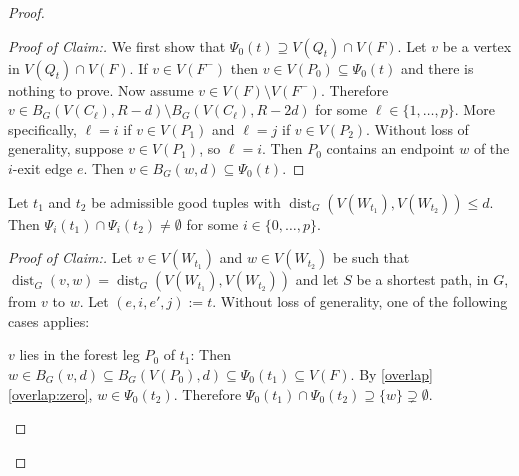 \documentclass{patmorin}
\newcommand{\pat}[1]{\textcolor{Blue}{Pat: #1}}
\newenvironment{clmproof}{\begin{proof}[Proof of Claim:]\renewcommand{\qedsymbol}{\rule{1ex}{1ex}}}{\end{proof}}
\DeclareMathOperator{\dist}{dist}
\begin{document}
\begin{proof}
\begin{clmproof}
  We first show that $\Psi_0(t)\supseteq V(Q_t)\cap V(F)$.  Let $v$ be a vertex in $V(Q_t)\cap V(F)$.  If $v\in V(F^-)$ then $v\in V(P_0)\subseteq\Psi_0(t)$ and there is nothing to prove.  Now assume $v\in V(F)\setminus V(F^-)$. Therefore $v\in B_G(V(C_\ell),R-d)\setminus B_G(V(C_\ell),R-2d)$ for some $\ell\in\{1,\ldots,p\}$.  More specifically, $\ell=i$ if $v\in V(P_1)$ and $\ell=j$ if $v\in V(P_2)$. Without loss of generality, suppose $v\in V(P_1)$, so $\ell=i$. Then $P_0$ contains an endpoint $w$ of the $i$-exit edge $e$. Then $v\in B_G(w,d)\subseteq\Psi_0(t)$.
\end{clmproof}

\begin{clm}
  Let $t_1$ and $t_2$ be admissible good tuples with $\dist_G(V(W_{t_1}),V(W_{t_2}))\le d$.  Then $\Psi_i(t_1)\cap \Psi_i(t_2)\neq\emptyset$ for some $i\in\{0,\ldots,p\}$.
\end{clm}



\begin{clmproof}
  Let $v\in V(W_{t_1})$ and $w\in V(W_{t_2})$ be such that $\dist_G(v,w)=\dist_G(V(W_{t_1}),V(W_{t_2}))$ and let $S$ be a shortest path, in $G$, from $v$ to $w$.  Let $(e,i,e',j):=t$.  Without loss of generality, one of the following cases applies:

  \begin{compactitem}
      \item $v$ lies in the forest leg $P_0$ of $t_1$: Then $w\in B_G(v,d)\subseteq B_G(V(P_0),d)\subseteq\Psi_0(t_1)\subseteq V(F)$.  By \cref{overlap}\cref{overlap:zero}, $w\in \Psi_0(t_2)$.   Therefore $\Psi_0(t_1)\cap\Psi_0(t_2)\supseteq\{w\}\supsetneq\emptyset$.


\end{compactitem}
\end{clmproof}
\end{proof}
\end{document}
